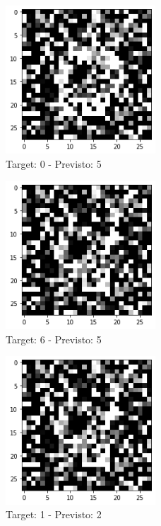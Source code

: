 \documentclass[12pt, a4paper]{article}
\begin{document}
\begin{figure}[H]
    \centering
    \caption{Target: 0 - Previsto: 5}
    \includegraphics[width=0.5\textwidth]{ErrClass2.png}
\end{figure}

\begin{figure}[H]
    \centering
    \caption{Target: 6 - Previsto: 5}
    \includegraphics[width=0.5\textwidth]{ErrClass3.png}
\end{figure}

\begin{figure}[H]
    \centering
    \caption{Target: 1 - Previsto: 2}
    \includegraphics[width=0.5\textwidth]{ErrClass4.png}
\end{figure}
\end{document}
